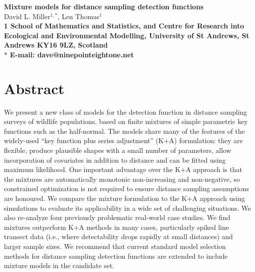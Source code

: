 \documentclass[10pt]{article}
\date{}
\begin{document}
\begin{flushleft}
{\Large
\textbf{Mixture models for distance sampling detection functions}
}
\\
David L. Miller$^{1,\ast}$,
Len Thomas$^{1}$
\\
\bf{1} School of Mathematics and Statistics, and Centre for Research into Ecological and Environmental Modelling, University of St Andrews, St Andrews KY16 9LZ, Scotland
\\
$\ast$ E-mail: dave@ninepointeightone.net
\end{flushleft}

\section*{Abstract}

We present a new class of models for the detection function in distance sampling surveys of wildlife populations, based on finite mixtures of simple parametric key functions such as the half-normal. The models share many of the features of the widely-used ``key function plus series adjustment'' (K+A) formulation: they are flexible, produce plausible shapes with a small number of parameters, allow incorporation of covariates in addition to distance and can be fitted using maximum likelihood. One important advantage over the K+A approach is that the mixtures are automatically monotonic non-increasing and non-negative, so constrained optimization is not required to ensure distance sampling assumptions are honoured. We compare the mixture formulation to the K+A approach using simulations to evaluate its applicability in a wide set of challenging situations. We also re-analyze four previously problematic real-world case studies.  We find mixtures outperform K+A methods in many cases, particularly spiked line transect data (i.e., where detectability drops rapidly at small distances) and larger sample sizes.  We recommend that current standard model selection methods for distance sampling detection functions are extended to include mixture models in the candidate set.


\end{document}
